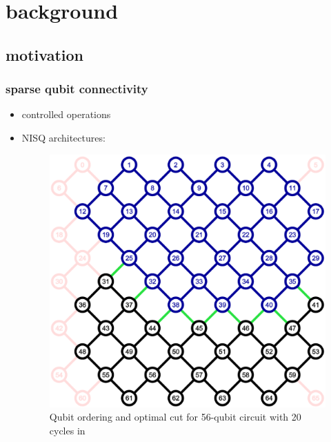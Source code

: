 \section{background}
\subsection{motivation}
\begin{frame}
    \frametitle{sparse qubit connectivity}
    \begin{itemize}
        \item controlled operations
        \item NISQ architectures:
        \begin{figure}
            \centering
            \includegraphics[width=.3\linewidth]{figure/connection.png}
            \caption{Qubit ordering and optimal cut for 56-qubit circuit
            with 20 cycles in \cite{Nash_2020}}
        \end{figure} 
    \end{itemize}
\end{frame}
